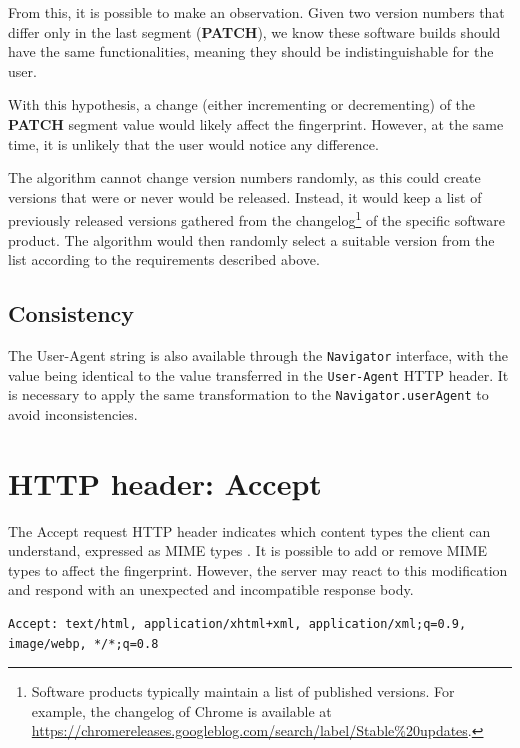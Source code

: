 From this, it is possible to make an observation. Given two version numbers that differ only in the last segment (\textbf{PATCH}), we know these software builds should have the same functionalities, meaning they should be indistinguishable for the user.

With this hypothesis, a change (either incrementing or decrementing) of the \textbf{PATCH} segment value would likely affect the fingerprint. However, at the same time, it is unlikely that the user would notice any difference.

The algorithm cannot change version numbers randomly, as this could create versions that were or never would be released. Instead, it would keep a list of previously released versions gathered from the changelog\footnote{Software products typically maintain a list of published versions. For example, the changelog of Chrome is available at \url{https://chromereleases.googleblog.com/search/label/Stable\%20updates}.} of the specific software product. The algorithm would then randomly select a suitable version from the list according to the requirements described above.

\subsection{Consistency}

The User-Agent string is also available through the \texttt{Navigator} interface, with the value being identical to the value transferred in the \texttt{User-Agent} HTTP header. It is necessary to apply the same transformation to the \texttt{Navigator.userAgent} to avoid inconsistencies.

\section{HTTP header: Accept}
\label{SectionHTTPHeaderAccept}

The Accept request HTTP header indicates which content types the client can understand, expressed as MIME types \cite{MDNHeaderAccept}. It is possible to add or remove MIME types to affect the fingerprint. However, the server may react to this modification and respond with an unexpected and incompatible response body.

\bigbreak

\begin{lstlisting}[caption={An example of Accept header contents \cite{MDNHeaderAccept}.}]
Accept: text/html, application/xhtml+xml, application/xml;q=0.9, image/webp, */*;q=0.8
\end{lstlisting}


